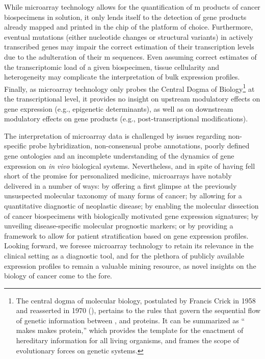 While microarray technology allows for the quantification of m
products of cancer biospecimens in solution, it only lends itself to the
detection of gene products already mapped and printed in the chip of the
platform of choice.  Furthermore, eventual mutations (either nucleotide changes
or structural variants) in actively transcribed genes may impair the correct
estimation of their transcription levels due to the adulteration of their
m sequences.  Even assuming correct estimates of the
transcriptomic load of a given biospecimen, tissue cellularity and heterogeneity
may complicate the interpretation of bulk expression profiles.  Finally, as
microarray technology only probes the Central Dogma of Biology\footnote{The
  central dogma of molecular biology, postulated by Francis Crick in 1958 and
  reasserted in 1970 (\citealp{crick_protein_1958,crick_central_1970}), pertains
  to the rules that govern the sequential flow of genetic information between
  ,  and proteins.  It can be summarized as
  `` makes  makes protein,'' which provides the
  template for the enactment of hereditary information for all living organisms,
  and frames the scope of evolutionary forces on genetic systems.} at the
transcriptional level, it provides no insight on upstream modulatory effects on
gene expression (e.g., epigenetic determinants), as well as on downstream
modulatory effects on gene products (e.g., post-transcriptional modifications).

The interpretation of microarray data is challenged by issues regarding
non-specific probe hybridization, non-consensual probe annotations, poorly
defined gene ontologies and an incomplete understanding of the dynamics of gene
expression on \emph{in vivo} biological systems.  Nevertheless, and in spite of
having fell short of the promise for personalized medicine, microarrays have
notably delivered in a number of ways: by offering a first glimpse at the
previously unsuspected molecular taxonomy of many forms of cancer; by allowing
for a quantitative diagnostic of neoplastic disease; by enabling the molecular
dissection of cancer biospecimens with biologically motivated gene expression
signatures; by unveiling disease-specific molecular prognostic markers; or by
providing a framework to allow for patient stratification based on gene
expression profiles.  Looking forward, we foresee microarray technology to
retain its relevance in the clinical setting as a diagnostic tool, and for the
plethora of publicly available expression profiles to remain a valuable mining
resource, as novel insights on the biology of cancer come to the fore.

